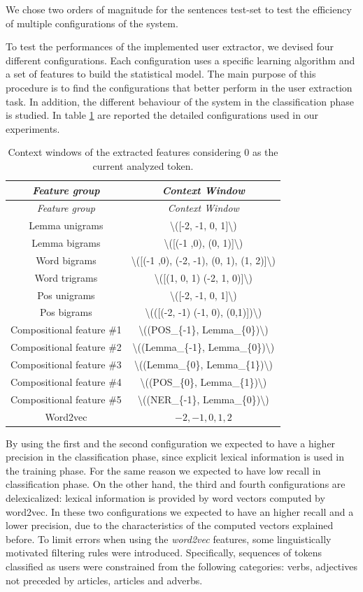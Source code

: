 \documentclass[b5paper,]{book}
\theoremstyle{definition}
\theoremstyle{definition}
\theoremstyle{definition}
\theoremstyle{remark}
\begin{document}
We chose two orders of magnitude for the sentences test-set to test the
efficiency of multiple configurations of the system.

To test the performances of the implemented user extractor, we devised
four different configurations. Each configuration uses a specific
learning algorithm and a set of features to build the statistical model.
The main purpose of this procedure is to find the configurations that
better perform in the user extraction task. In addition, the different
behaviour of the system in the classification phase is studied. In table
\ref{tab:feat-confs} are reported the detailed configurations used in
our experiments.

\begin{longtable}[]{@{}cc@{}}
\caption{\label{tab:feat-confs} Context windows of the extracted features
considering 0 as the current analyzed token.}\tabularnewline
\toprule
\emph{Feature group} & \emph{Context Window}\tabularnewline
\midrule
\endfirsthead
\toprule
\emph{Feature group} & \emph{Context Window}\tabularnewline
\midrule
\endhead
Lemma unigrams & \textbackslash{}({[}-2, -1, 0,
1{]}\textbackslash{})\tabularnewline
Lemma bigrams & \textbackslash{}({[}(-1 ,0), (0,
1){]}\textbackslash{})\tabularnewline
Word bigrams & \textbackslash{}({[}(-1 ,0), (-2, -1), (0, 1), (1,
2){]}\textbackslash{})\tabularnewline
Word trigrams & \textbackslash{}({[}(1, 0, 1) (-2, 1,
0){]}\textbackslash{})\tabularnewline
Pos unigrams & \textbackslash{}({[}-2, -1, 0,
1{]}\textbackslash{})\tabularnewline
Pos bigrams & \textbackslash{}(({[}(-2, -1) (-1, 0),
(0,1){]})\textbackslash{})\tabularnewline
Compositional feature \#1 & \textbackslash{}((POS\_\{-1\},
Lemma\_\{0\})\textbackslash{})\tabularnewline
Compositional feature \#2 & \textbackslash{}((Lemma\_\{-1\},
Lemma\_\{0\})\textbackslash{})\tabularnewline
Compositional feature \#3 & \textbackslash{}((Lemma\_\{0\},
Lemma\_\{1\})\textbackslash{})\tabularnewline
Compositional feature \#4 & \textbackslash{}((POS\_\{0\},
Lemma\_\{1\})\textbackslash{})\tabularnewline
Compositional feature \#5 & \textbackslash{}((NER\_\{-1\},
Lemma\_\{0\})\textbackslash{})\tabularnewline
Word2vec & \(-2, -1, 0, 1, 2\)\tabularnewline
\bottomrule
\end{longtable}

By using the first and the second configuration we expected to have a
higher precision in the classification phase, since explicit lexical
information is used in the training phase. For the same reason we
expected to have low recall in classification phase. On the other hand,
the third and fourth configurations are delexicalized: lexical
information is provided by word vectors computed by word2vec. In these
two configurations we expected to have an higher recall and a lower
precision, due to the characteristics of the computed vectors explained
before. To limit errors when using the \emph{word2vec} features, some
linguistically motivated filtering rules were introduced. Specifically,
sequences of tokens classified as users were constrained from the
following categories: verbs, adjectives not preceded by articles,
articles and adverbs.
\end{document}
